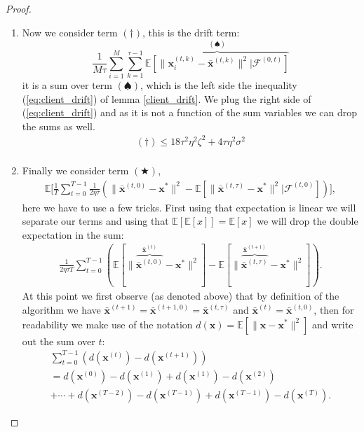 \begin{proof}
\begin{enumerate}
        \item Now we consider term $(\dagger)$, this is the drift term:
        \[ \frac{1}{M \tau}\sum^M_{i=1} \sum^{\tau-1}_{k=1} \overbrace{\mathbb{E} \left[ \| \bm{x}_i^{(t,k)} -\bar{\bm{x}}^{(t,k)} \|^2 | \mathcal{F}^{(0,t)}\right]}^{(\spadesuit)} \]
        it is a sum over term $(\spadesuit)$, which is the left side the inequality (\ref{eq:client_drift}) of lemma \ref{client_drift}. We plug the right side of (\ref{eq:client_drift}) and as it is not a function of the sum variables we can drop the sums as well.
        \begin{align*}
            (\dagger) \leq 18\tau^2 \eta^2 \zeta^2 + 4 \tau \eta^2 \sigma^2 \\
        \end{align*}
        \item Finally we consider term $(\bigstar)$, 
        \begin{align*}
            \mathbb{E}\Bigg[ \frac{1}{T} \sum_{t=0}^{T-1} \frac{1}{2 \eta \tau} \left( \| \bar{\bm{x}}^{(t,0)} -\bm{x}^{*} \|^2 - \mathbb{E}\left[  \| \bar{\bm{x}}^{(t,\tau)} -\bm{x}^{*} \|^2  | \mathcal{F}^{(t,0)}\right] \right) \Bigg],
        \end{align*}
        here we have to use a few tricks. First using that expectation is linear we will separate our terms and using that $\mathbb{E}\left[ \mathbb{E}[x] \right] = \mathbb{E}[x]$ we will drop the double expectation in the sum:
        \begin{align*}
            \frac{1}{2 \eta \tau T}  \sum_{t=0}^{T-1}   \left(\mathbb{E}\left[  \| \overbrace{\bar{\bm{x}}^{(t,0)}}^{\bar{\bm{x}}^{(t)}} -\bm{x}^{*} \|^2 \right] - \mathbb{E}\left[  \| \overbrace{\bar{\bm{x}}^{(t,\tau)}}^{\bar{\bm{x}}^{(t+1)}} -\bm{x}^{*} \|^2  \right] \right).
        \end{align*}
        At this point we first observe (as denoted above) that by definition of the algorithm we have $\bar{\bm{x}}^{(t+1)} = \bar{\bm{x}}^{(t+1,0)} = \bar{\bm{x}}^{(t,\tau)}$ and $\bar{\bm{x}}^{(t)} = \bar{\bm{x}}^{(t,0)}$, then for readability we make use of the notation $d(\bm{x}) = \mathbb{E} \left[ \| \bm{x}-\bm{x}^*\|^2 \right]$ and write out the sum over $t$:
        \begin{align*}
           \sum_{t=0}^{T-1}  \left( d(\bm{x}^{(t)}) - d(\bm{x}^{(t+1)}) \right)
            \\=  d(\bm{x}^{(0)}) - d(\bm{x}^{(1)}) +  d(\bm{x}^{(1)}) - d(\bm{x}^{(2)})  \\
            + \cdots +  d(\bm{x}^{(T-2)}) - d(\bm{x}^{(T-1)})  + d(\bm{x}^{(T-1)}) - d(\bm{x}^{(T)}) .

\end{align*}
\end{enumerate}
\end{proof}
